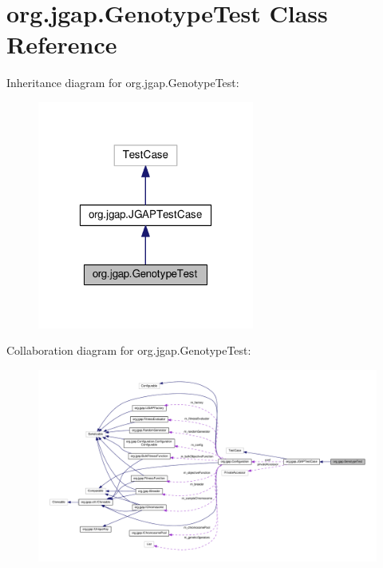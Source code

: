 \hypertarget{classorg_1_1jgap_1_1_genotype_test}{\section{org.\-jgap.\-Genotype\-Test Class Reference}
\label{classorg_1_1jgap_1_1_genotype_test}
}


Inheritance diagram for org.\-jgap.\-Genotype\-Test\-:
\nopagebreak
\begin{figure}[H]
\begin{center}
\leavevmode
\includegraphics[width=202pt]{classorg_1_1jgap_1_1_genotype_test__inherit__graph}
\end{center}
\end{figure}


Collaboration diagram for org.\-jgap.\-Genotype\-Test\-:
\nopagebreak
\begin{figure}[H]
\begin{center}
\leavevmode
\includegraphics[width=350pt]{classorg_1_1jgap_1_1_genotype_test__coll__graph}
\end{center}
\end{figure}
